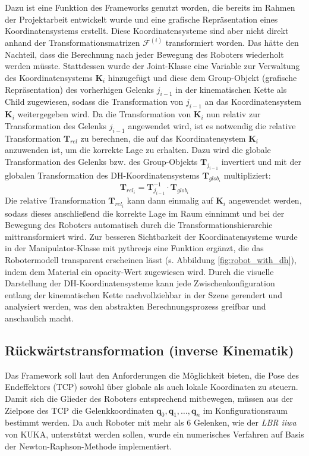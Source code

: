Dazu ist eine Funktion des Frameworks genutzt worden, die bereits im Rahmen der Projektarbeit entwickelt wurde und eine grafische Repräsentation eines Koordinatensystems erstellt.
Diese Koordinatensysteme sind aber nicht direkt anhand der Transformationsmatrizen $\mathcal{F}^{(i)}$ transformiert worden.
Das hätte den Nachteil, dass die Berechnung nach jeder Bewegung des Roboters wiederholt werden müsste.
Stattdessen wurde der Joint-Klasse eine Variable zur Verwaltung des Koordinatensystems $\mathbf{K}_i$ hinzugefügt und diese dem Group-Objekt (grafische Repräsentation) des vorherhigen Gelenks $j_{i-1}$ in der kinematischen Kette als Child zugewiesen,
sodass die Transformation von $j_{i-1}$ an das Koordinatensystem $\mathbf{K}_i$ weitergegeben wird.
Da die Transformation von $\mathbf{K}_i$ nun relativ zur Transformation des Gelenks $j_{i-1}$ angewendet wird,
ist es notwendig die relative Transformation $\mathbf{T}_{rel}$ zu berechnen, die auf das Koordinatensystem $\mathbf{K}_i$
anzuwenden ist, um die korrekte Lage zu erhalten.
Dazu wird die globale Transformation des Gelenks bzw. des Group-Objekts $\mathbf{T}_{j_{i-1}}$ invertiert und mit der globalen Transformation des DH-Koordinatensystems $\mathbf{T}_{glob_i}$ multipliziert:
\[
    \mathbf{T}_{rel_i} = \mathbf{T}_{j_{i-1}}^{-1} \cdot \mathbf{T}_{glob_i}
\] 
Die relative Transformation $\mathbf{T}_{rel_i}$ kann dann einmalig auf $\mathbf{K}_i$ angewendet werden,
sodass dieses anschließend die korrekte Lage im Raum einnimmt und bei der Bewegung des Roboters automatisch durch die Transformationshierarchie mittransformiert wird.
Zur besseren Sichtbarkeit der Koordinatensysteme wurde in der Manipulator-Klasse mit pythreejs eine Funktion ergänzt, die das Robotermodell transparent erscheinen lässt (s. Abbildung \ref{fig:robot_with_dh}), indem dem Material ein opacity-Wert zugewiesen wird.
Durch die visuelle Darstellung der DH-Koordinatensysteme kann jede Zwischenkonfiguration entlang der kinematischen Kette nachvollziehbar in der Szene gerendert und analysiert werden, was den abstrakten Berechnungsprozess greifbar und anschaulich macht.



\subsection{Rückwärtstransformation (inverse Kinematik)}

Das Framework soll laut den Anforderungen die Möglichkeit bieten, die Pose des Endeffektors (TCP) sowohl über globale als auch lokale Koordinaten zu steuern.
Damit sich die Glieder des Roboters entsprechend mitbewegen, müssen aus der Zielpose des TCP die Gelenkkoordinaten $\mathbf{q}_0, \mathbf{q}_1, \dots, \mathbf{q}_n$ im Konfigurationsraum bestimmt werden.
Da auch Roboter mit mehr als 6 Gelenken, wie der \textit{LBR iiwa} von KUKA, unterstützt werden sollen, wurde ein numerisches Verfahren auf Basis der Newton-Raphson-Methode implementiert.

